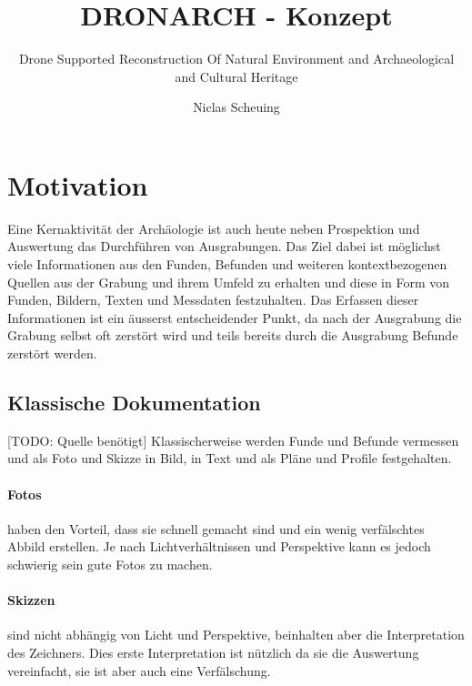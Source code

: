 \documentclass{paper}
\begin{document}
	\title{DRONARCH - Konzept}
	\subtitle{Drone Supported Reconstruction Of Natural Environment and Archaeological and Cultural Heritage}
	
	\author{Niclas Scheuing}
	
	\maketitle
	\tableofcontents

	
	\section{Motivation}
		Eine Kernaktivität der Archäologie ist auch heute neben Prospektion und Auswertung das Durchführen von Ausgrabungen.
		Das Ziel dabei ist möglichst viele Informationen aus den Funden, Befunden und weiteren kontextbezogenen Quellen aus der Grabung und ihrem Umfeld zu erhalten und diese in Form von Funden, Bildern, Texten und Messdaten festzuhalten.
		Das Erfassen dieser Informationen ist ein äusserst entscheidender Punkt, da nach der Ausgrabung die Grabung selbst oft zerstört wird und teils bereits durch die Ausgrabung Befunde zerstört werden.
		
		\subsection{Klassische Dokumentation}
			[TODO: Quelle benötigt]
			Klassischerweise werden Funde und Befunde vermessen und als Foto und Skizze in Bild, in Text und als Pläne und Profile festgehalten.

			\paragraph{Fotos} haben den Vorteil, dass sie schnell gemacht sind und ein wenig verfälschtes Abbild erstellen. Je nach Lichtverhältnissen und Perspektive kann es jedoch schwierig sein gute Fotos zu machen.
			
			\paragraph{Skizzen} sind nicht abhängig von Licht und Perspektive, beinhalten aber die Interpretation des Zeichners. Dies erste Interpretation ist nützlich da sie die Auswertung vereinfacht, sie ist aber auch eine Verfälschung.
			
\end{document}
